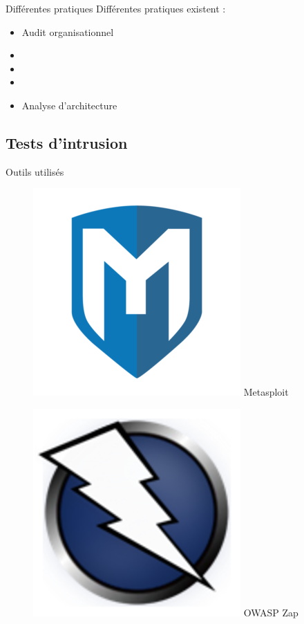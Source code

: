\documentclass{beamer}
\newcommand{\colorized}[1]{{\color{red}{#1}}}
\begin{document}
			\begin{frame}{Différentes pratiques}
				Différentes pratiques existent : 
				\begin{itemize}
					\item Audit organisationnel
					\item \colorized{Tests d'intrusion (fuzzing)}
					\item \colorized{Revue de code source}
					\item \colorized{Relevés de configuration}
					\item Analyse d'architecture
				\end{itemize}		
			\end{frame}
		
		\subsection{Tests d'intrusion} 
			\begin{frame}{Outils utilisés}
				\begin{figure}
			        \centering
			        \begin{minipage}{.5\textwidth}
			            \centering
			            \includegraphics[width=.4\linewidth]{schemas/images/metasploit.png}
			            \break
			            Metasploit
			        \end{minipage}%
			        \begin{minipage}{.5\textwidth}
			            \centering
			            \includegraphics[width=.4\linewidth]{schemas/images/zap.png}
			            \break 
			            OWASP Zap
			        \end{minipage}
	    		\end{figure}	
			\end{frame}
			
\end{document}
